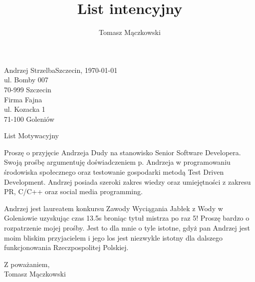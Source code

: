 \documentclass[12pt,a4paper]{letter}
\author{Tomasz Mączkowski}
\title{List intencyjny}
\begin{document}
\begin{flushleft}
Andrzej Strzelba\hfill Szczecin, \today\\
ul. Bomby 007\\
70-999 Szczecin\\

\vspace{3cm}
\hspace{9cm}Firma Fajna\\
\hspace{9cm}ul. Kozacka 1\\
\hspace{9cm}71-100 Goleniów\\
\end{flushleft}
\vspace{1.5cm}
\begin{center}
\Large{List Motywacyjny}
\end{center}

Proszę o przyjęcie Andrzeja Dudy na stanowisko Senior Software Developera. Swoją prośbę argumentuję doświadczeniem p. Andrzeja w programowaniu środowiska społecznego oraz testowanie gospodarki metodą Test Driven Development. Andrzej posiada szeroki zakres wiedzy oraz umiejętności z zakresu PR, C/C++ oraz social media programming.

Andrzej jest laureatem konkursu Zawody Wyciągania Jabłek z Wody w Goleniowie uzyskując czas 13.5s broniąc tytuł mistrza po raz 5! Proszę bardzo o rozpatrzenie mojej prośby. Jest to dla mnie o tyle istotne, gdyż pan Andrzej jest moim bliskim przyjacielem i jego los jest niezwykle istotny dla dalszego funkcjonowania Rzeczpospolitej Polskiej.

\begin{flushleft}
\vspace{3cm}
\hspace{9cm} Z poważaniem, \\
\hspace{9cm} Tomasz Mączkowski
\end{flushleft}
\end{document}

